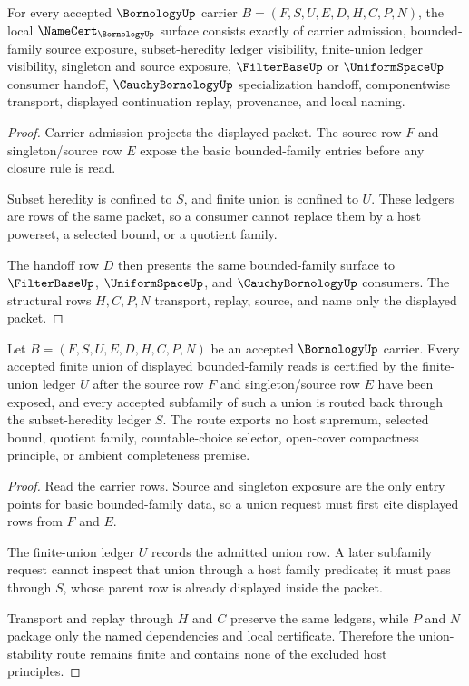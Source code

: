 \begin{theorem}
\label{thm:bornology-namecert-obligations}
For every accepted $\BornologyUp$ carrier $B=(F,S,U,E,D,H,C,P,N)$, the local $\NameCert_{\BornologyUp}$ surface consists exactly of carrier admission, bounded-family source exposure, subset-heredity ledger visibility, finite-union ledger visibility, singleton and source exposure, $\FilterBaseUp$ or $\UniformSpaceUp$ consumer handoff, $\CauchyBornologyUp$ specialization handoff, componentwise transport, displayed continuation replay, provenance, and local naming.
\end{theorem}
\begin{proof}
Carrier admission projects the displayed packet. The source row $F$ and singleton/source row $E$ expose the basic bounded-family entries before any closure rule is read.

Subset heredity is confined to $S$, and finite union is confined to $U$. These ledgers are rows of the same packet, so a consumer cannot replace them by a host powerset, a selected bound, or a quotient family.

The handoff row $D$ then presents the same bounded-family surface to $\FilterBaseUp$, $\UniformSpaceUp$, and $\CauchyBornologyUp$ consumers. The structural rows $H,C,P,N$ transport, replay, source, and name only the displayed packet.
\end{proof}

\begin{theorem}
\label{thm:bornology-bounded-family-union-stability}
Let $B=(F,S,U,E,D,H,C,P,N)$ be an accepted $\BornologyUp$ carrier. Every accepted finite union of displayed bounded-family reads is certified by the finite-union ledger $U$ after the source row $F$ and singleton/source row $E$ have been exposed, and every accepted subfamily of such a union is routed back through the subset-heredity ledger $S$. The route exports no host supremum, selected bound, quotient family, countable-choice selector, open-cover compactness principle, or ambient completeness premise.
\end{theorem}
\begin{proof}
Read the carrier rows. Source and singleton exposure are the only entry points for basic bounded-family data, so a union request must first cite displayed rows from $F$ and $E$.

The finite-union ledger $U$ records the admitted union row. A later subfamily request cannot inspect that union through a host family predicate; it must pass through $S$, whose parent row is already displayed inside the packet.

Transport and replay through $H$ and $C$ preserve the same ledgers, while $P$ and $N$ package only the named dependencies and local certificate. Therefore the union-stability route remains finite and contains none of the excluded host principles.
\end{proof}

